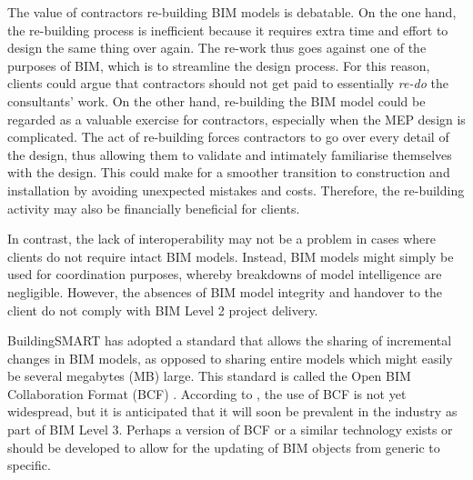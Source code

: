 The value of contractors re-building BIM models is debatable.
On the one hand, the re-building process is inefficient because it requires extra time and effort to design the same thing over again.
The re-work thus goes against one of the purposes of BIM, which is to streamline the design process.
For this reason, clients could argue that contractors should not get paid to essentially \emph{re-do} the consultants' work.
On the other hand, re-building the BIM model could be regarded as a valuable exercise for contractors, especially when the MEP design is complicated.
The act of re-building forces contractors to go over every detail of the design, thus allowing them to validate and intimately familiarise themselves with the design.
This could make for a smoother transition to construction and installation by avoiding unexpected mistakes and costs.
Therefore, the re-building activity may also be financially beneficial for clients.

In contrast, the lack of interoperability may not be a problem in cases where clients do not require intact BIM models.
Instead, BIM models might simply be used for coordination purposes, whereby breakdowns of model intelligence are negligible.
However, the absences of BIM model integrity and handover to the client do not comply with BIM Level 2 project delivery.

BuildingSMART has adopted a standard that allows the sharing of incremental changes in BIM models, as opposed to sharing entire models which might easily be several megabytes (MB) large.
This standard is called the Open BIM Collaboration Format (BCF) \citep{Bosche, buildingsmart}.
According to \cite{Bosche}, the use of BCF is not yet widespread, but it is anticipated that it will soon be prevalent in the industry as part of BIM Level 3.
Perhaps a version of BCF or a similar technology exists or should be developed to allow for the updating of BIM objects from generic to specific.




